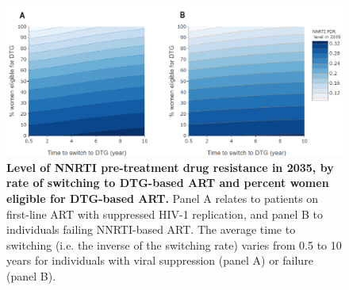 \documentclass[10pt,letterpaper]{article}
\providecommand{\DIFaddbeginFL}{} %
\providecommand{\DIFaddendFL}{} %
\newcommand{\DIFaddincludegraphics}[2][]{{\color{blue}\fbox{\DIFOincludegraphics[#1]{#2}}}} %
\DeclareRobustCommand{\DIFaddbeginFL}{\DIFOaddbeginFL \let\includegraphics\DIFaddincludegraphics} %
\DeclareRobustCommand{\DIFaddendFL}{\DIFOaddendFL \let\includegraphics\DIFOincludegraphics} %
\begin{document}
\begin{figure}[h]
   \DIFaddbeginFL \includegraphics[width=14cm]{../figures/Fig4r.png}
   \DIFaddendFL \vspace{0.5cm}
   \caption{{\bf Level of NNRTI pre-treatment drug resistance in 2035, by rate of switching to DTG-based ART and percent women eligible for DTG-based ART.}
Panel A relates to patients on first-line ART with suppressed HIV-1 replication, and panel B to individuals failing NNRTI-based ART. The average time to switching (i.e. the inverse of the switching rate) varies from 0.5 to 10 years for individuals with viral suppression (panel A) or failure (panel B).}\label{fig4}
\end{figure}
\end{document}
